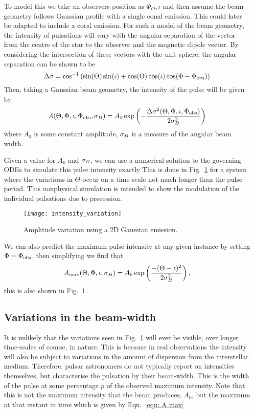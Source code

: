\documentclass[../full_thesis/full_thesis.tex]{subfiles}
\begin{document}
To model this we take an observers position as $\Phi_{O}, \iota$ and then
assume the beam geometry follows Gaussian profile with a single conal emission.
This could later be adapted to include a coral emission.  For such a model of
the beam geometry, the intensity of pulsations will vary with the angular
separation of the vector from the centre of the star to the observer and the
magnetic dipole vector. By considering the intersection of these vectors with
the unit sphere, the angular separation can be shown to be
\begin{equation}
\Delta\sigma = \cos^{-1}\left(\sin(\Theta)\sin(\iota) +
                             \cos(\Theta)\cos(\iota)\cos(\Phi - \Phi_{\mathrm{obs}})\right)
\label{eqn: angular sep inv cos}
\end{equation}
Then, taking a Gaussian beam geometry, the intensity of the pulse will be given by
\begin{equation}
A(\Theta, \Phi, \iota, \Phi_{\mathrm{obs}}, \sigma_{B}) =
A_{0} \exp\left(-\frac{\Delta\sigma^{2}(\Theta, \Phi, \iota, \Phi_{\mathrm{obs}})}{2\sigma_{B}^{2}}\right)
\label{eqn: gaussian beam intensity}
\end{equation}
where $A_{0}$ is some constant amplitude, $\sigma_{B}$ is a measure of the
angular beam width.

Given a value for $A_0$ and $\sigma_{B}$, we can use a numerical solution to the
governing ODEs to simulate this pulse intensity exactly This is done in
Fig.~\ref{fig: intensity variation} for a system where the variations in
$\Theta$ occur on a time scale not much longer than the pulse period. This
nonphysical simulation is intended to show the modulation of the individual
pulsations due to precession.
\begin{figure}[htb]
\centering
\texttt{[image: intensity\_variation]}
\caption{Amplitude variation using a 2D Gaussian emission.}
\label{fig: intensity variation}
\end{figure}
We can also predict the maximum pulse intensity at any given instance by setting
$\Phi=\Phi_{\mathrm{obs}}$, then simplifying we find that
\begin{align}
A_{\mathrm{max}}(\Theta, \Phi, \iota, \sigma_{B}) =
A_{0}\exp\left(\frac{-(\Theta-\iota)^{2}}{2\sigma_{B}^{2}}\right),
\label{eqn: A max}
\end{align}
this is also shown in Fig.~\ref{fig: intensity variation}.

\subsection{Variations in the beam-width}
It is unlikely that the variations seen in Fig.~\ref{fig: intensity variation}
will ever be visible, over longer time-scales of course, in nature. This is because
in real observations the intensity will also be subject to variations in the
amount of dispersion from the interstellar medium. Therefore, pulsar astronomers
do not typically report on intensities themselves, but characterise the pulsation
by their beam-width. This is the width of the pulse at some percentage $p$ of
the observed maximum intensity. Note that this is not the maximum intensity that
the beam produces, $A_0$, but the maximum at that instant in time which is
given by Eqn.~\eqref{eqn: A max}
\end{document}
